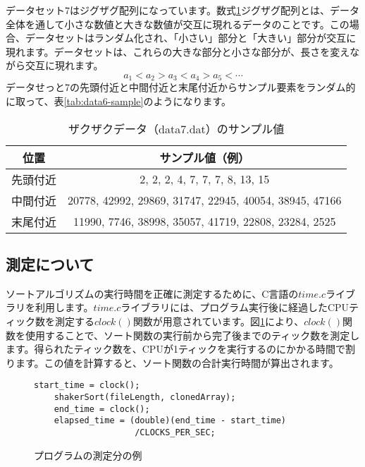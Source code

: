 \documentclass[a4j, 12pt]{jarticle}
\begin{document}
データセット7はジグザグ配列になっています。数式\ref{tab:data7-sample}ジグザグ配列とは、データ全体を通して小さな数値と大きな数値が交互に現れるデータのことです。この場合、データセットはランダム化され、「小さい」部分と「大きい」部分が交互に現れます。データセットは、これらの大きな部分と小さな部分が、長さを変えながら交互に現れます。\\
\begin{equation}\label{zigzagsequence}
  a_1 < a_2 > a_3 < a_4 > a_5 < \cdots
\end{equation}
データせっと7の先頭付近と中間付近と末尾付近からサンプル要素をランダム的に取って、表\ref{tab:data6-sample}のようになります。
\begin{table}[H]
  \centering
  \caption{ザクザクデータ（data7.dat）のサンプル値}
  \begin{tabular}{|c|c|}
    \hline
    位置 & サンプル値（例） \\
    \hline
    先頭付近 & 2, 2, 2, 4, 7, 7, 7, 8, 13, 15 \\
    中間付近 & 20778, 42992, 29869, 31747, 22945, 40054, 38945, 47166 \\
    末尾付近 & 11990, 7746, 38998, 35057, 41719, 22808, 23284, 2525\\
    \hline
  \end{tabular}\label{tab:data7-sample}
\end{table}
\subsection{測定について}
ソートアルゴリズムの実行時間を正確に測定するために、C言語の$time.c$ライブラリを利用します。$time.c$ライブラリには、プログラム実行後に経過したCPUティック数を測定する$clock()$関数が用意されています。図\ref{fig:clockcode}により、$clock()$関数を使用することで、ソート関数の実行前から完了後までのティック数を測定します。得られたティック数を、CPUが1ティックを実行するのにかかる時間で割ります。この値を計算すると、ソート関数の合計実行時間が算出されます。
\begin{figure}[htbp]
  \centering
  \caption{プログラムの測定分の例}\label{fig:clockcode}
  \begin{lstlisting}[basicstyle=\ttfamily\small]
    start_time = clock();
    shakerSort(fileLength, clonedArray);
    end_time = clock();
    elapsed_time = (double)(end_time - start_time)
                    /CLOCKS_PER_SEC;
  \end{lstlisting}
\end{figure}
\newpage
\end{document}
